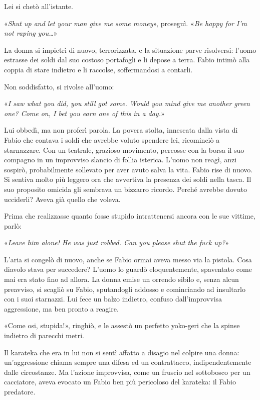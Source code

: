 Lei si chetò all'istante.

«\textit{Shut up and let your man give me some money}», proseguì. «\textit{Be happy for I'm not raping you\ldots}»

La donna si impietrì di nuovo, terrorizzata, e la situazione parve risolversi: l'uomo estrasse dei soldi dal suo costoso portafogli e li depose a terra. Fabio intimò alla coppia di stare indietro e li raccolse, soffermandosi a contarli.

Non soddisfatto, si rivolse all'uomo:

«\textit{I saw what you did, you still got some. Would you mind give me another green one? Come on, I bet you earn one of this in a day.}»

Lui obbedì, ma non proferì parola. La povera stolta, innescata dalla vista di Fabio che contava i soldi che avrebbe voluto spendere lei, ricominciò a starnazzare. Con un teatrale, grazioso movimento, percosse con la borsa il suo compagno in un improvviso slancio di follia isterica. L'uomo non reagì, anzi sospirò, probabilmente sollevato per aver avuto salva la vita. Fabio rise di nuovo. Si sentiva molto più leggero ora che avvertiva la presenza dei soldi nella tasca. Il suo proposito omicida gli sembrava un bizzarro ricordo. Perché avrebbe dovuto ucciderli? Aveva già quello che voleva.

Prima che realizzasse quanto fosse stupido intrattenersi ancora con le sue vittime, parlò:

«\textit{Leave him alone! He was just robbed. Can you please shut the fuck up?}»

L'aria si congelò di nuovo, anche se Fabio ormai aveva messo via la pistola. Cosa diavolo stava per succedere? L'uomo lo guardò eloquentemente, spaventato come mai era stato fino ad allora. La donna emise un orrendo sibilo e, senza alcun preavviso, si scagliò su Fabio, sputandogli addosso e cominciando ad insultarlo con i suoi starnazzi. Lui fece un balzo indietro, confuso dall'improvvisa aggressione, ma ben pronto a reagire.

«Come osi, stupida!», ringhiò, e le assestò un perfetto yoko-geri che la spinse indietro di parecchi metri.

Il karateka che era in lui non si sentì affatto a disagio nel colpire una donna: un'aggressione chiama sempre una difesa ed un contrattacco, indipendentemente dalle circostanze. Ma l'azione improvvisa, come un fruscio nel sottobosco per un cacciatore, aveva evocato un Fabio ben più pericoloso del karateka: il Fabio predatore.

